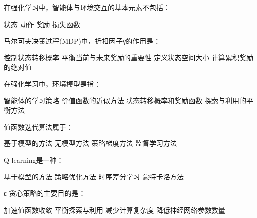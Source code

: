 \documentclass[zihao=5,answers]{BHCexam}
\begin{document}
\renewcommand{\O}{\mathcal{O}}


\maketitle


\begin{questions}

\xuanze

\question 在强化学习中，智能体与环境交互的基本元素不包括：
\begin{choices}
    \choice 状态
    \choice 动作
    \choice 奖励
    \CorrectChoice 损失函数
\end{choices}

\question 马尔可夫决策过程(MDP)中，折扣因子γ的作用是：
\begin{choices}
    \choice 控制状态转移概率
    \CorrectChoice 平衡当前与未来奖励的重要性
    \choice 定义状态空间大小
    \choice 计算累积奖励的绝对值
\end{choices}

\question 在强化学习中，环境模型是指：
\begin{choices}
    \choice 智能体的学习策略
    \choice 价值函数的近似方法
    \CorrectChoice 状态转移概率和奖励函数
    \choice 探索与利用的平衡方法
\end{choices}

\question 值函数迭代算法属于：
\begin{choices}
    \CorrectChoice 基于模型的方法
    \choice 无模型方法
    \choice 策略梯度方法
    \choice 监督学习方法
\end{choices}

\question Q-learning是一种：
\begin{choices}
    \choice 基于模型的方法
    \choice 策略优化方法
    \CorrectChoice 时序差分学习
    \choice 蒙特卡洛方法
\end{choices}

\question ε-贪心策略的主要目的是：
\begin{choices}
    \choice 加速值函数收敛
    \CorrectChoice 平衡探索与利用
    \choice 减少计算复杂度
    \choice 降低神经网络参数数量
\end{choices}


\end{questions}
\end{document}
